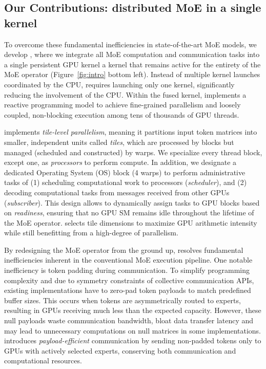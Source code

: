 \subsection{Our Contributions: distributed MoE in a single kernel}
To overcome these fundamental inefficiencies in state-of-the-art MoE models, we develop \sysname, where we integrate all MoE computation and communication tasks into a single persistent GPU kernel
\ie a kernel that remains active for the entirety of the MoE operator (Figure~\ref{fig:intro} bottom left).
Instead of multiple kernel launches coordinated by the CPU, \sysname requires launching only one kernel,
significantly reducing the involvement of the CPU\@.
Within the fused kernel, \sysname implements a reactive programming model to achieve
fine-grained parallelism and loosely coupled, non-blocking execution among tens of thousands of GPU threads.

\sysname implements \emph{tile-level parallelism},
meaning it partitions input token matrices into smaller, independent units called \emph{tiles},
which are processed by blocks but managed (scheduled and constructed) by warps.
We specialize every thread block, except one, as \emph{processors} to perform compute.
In addition, we designate a dedicated Operating System (OS) block (4 warps) to perform administrative tasks of
(1) scheduling computational work to processors (\emph{scheduler}),
and (2) decoding computational tasks from messages received from other GPUs (\emph{subscriber}).
This design allows \sysname to dynamically assign tasks to GPU blocks based on \emph{readiness},
ensuring that no GPU SM remains idle throughout the lifetime of the MoE operator.
\sysname selects tile dimensions to maximize GPU arithmetic intensity
while still benefitting from a high-degree of parallelism.

By redesigning the MoE operator from the ground up,
\sysname resolves fundamental inefficiencies inherent in the conventional MoE execution pipeline.
One notable inefficiency is token padding during communication.
To simplify programming complexity and due to symmetry constraints of collective communication APIs,
existing implementations have to zero-pad token payloads to match predefined buffer sizes.
This occurs when tokens are asymmetrically routed to experts, resulting in GPUs receiving much less than the expected
capacity.
However, these null payloads waste communication bandwidth, bloat data transfer latency and may lead to
unnecessary computations on null matrices in some implementations.
\sysname introduces \emph{payload-efficient} communication by sending non-padded tokens only to
GPUs with actively selected experts, conserving both communication and computational resources.

